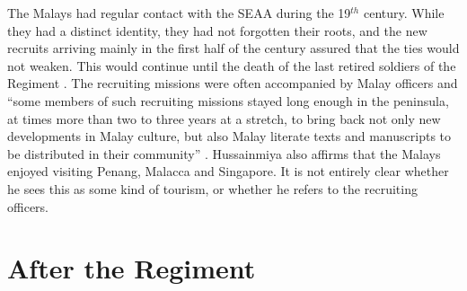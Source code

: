 The Malays had regular contact with the SEAA during the 19$^{th}$ century. While they had a distinct identity, they had not forgotten their roots, and the new recruits arriving mainly in the first half of the century assured that the ties would not weaken. This would continue until the death of the last retired soldiers of the Regiment \citep[13]{Hussainmiya1987}. The recruiting missions were often accompanied by Malay officers and    ``some members of such recruiting missions stayed long enough in the peninsula, at times more than two to three years at a stretch, to bring back not only new developments in Malay culture, but also Malay literate texts and manuscripts to be distributed in their community'' \citep[13]{Hussainmiya1987}. Hussainmiya also affirms that the Malays enjoyed visiting Penang, Malacca and Singapore. It is not entirely clear whether he sees this as some kind of tourism, or whether he refers to the recruiting officers.





\section{After the Regiment}\label{sec:slmbg:PostregimentalHistory}
 

